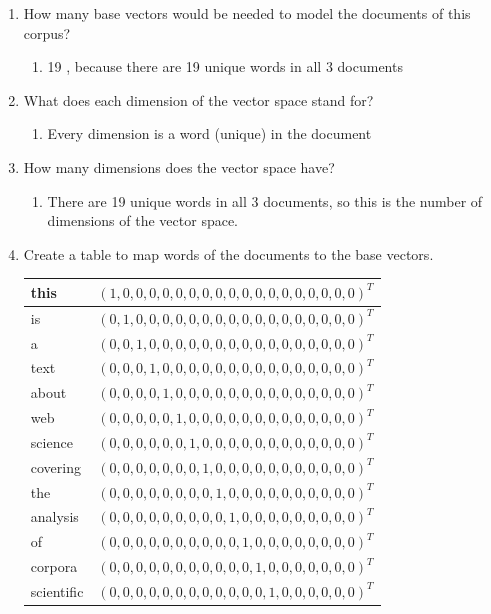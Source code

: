 \documentclass{WeSTassignment}
\begin{document}
\begin{enumerate}
\item How many base vectors would be needed to model the documents of this corpus?
\begin{enumerate}
\item 19 , because there are 19 unique words in all 3 documents
\end{enumerate}
\item What does each dimension of the vector space stand for?
\begin{enumerate}
\item Every dimension is a word (unique) in the document
\end{enumerate}
\item How many dimensions does the vector space have? 
\begin{enumerate}
\item There are 19 unique words in all 3 documents, so this is the number of dimensions of the vector space.
\end{enumerate}
\item Create a table to map words of the documents to the base vectors.\\
\begin{tabular}{ | l | r | }
\hline
  this & $(1,0,0,0,0,0,0,0,0,0,0,0,0,0,0,0,0,0,0)^{T}$ \\ \hline
  is & $(0,1,0,0,0,0,0,0,0,0,0,0,0,0,0,0,0,0,0)^{T}$ \\ \hline
  a & $(0,0,1,0,0,0,0,0,0,0,0,0,0,0,0,0,0,0,0)^{T}$\\ \hline
  text & $(0,0,0,1,0,0,0,0,0,0,0,0,0,0,0,0,0,0,0)^{T}$\\ \hline
  about & $(0,0,0,0,1,0,0,0,0,0,0,0,0,0,0,0,0,0,0)^{T}$\\ \hline
  web & $(0,0,0,0,0,1,0,0,0,0,0,0,0,0,0,0,0,0,0)^{T}$\\ \hline
  science & $(0,0,0,0,0,0,1,0,0,0,0,0,0,0,0,0,0,0,0)^{T}$\\ \hline
  covering & $(0,0,0,0,0,0,0,1,0,0,0,0,0,0,0,0,0,0,0)^{T}$ \\ \hline
  the & $(0,0,0,0,0,0,0,0,1,0,0,0,0,0,0,0,0,0,0)^{T}$\\ \hline
  analysis & $(0,0,0,0,0,0,0,0,0,1,0,0,0,0,0,0,0,0,0)^{T}$ \\ \hline
  of & $(0,0,0,0,0,0,0,0,0,0,1,0,0,0,0,0,0,0,0)^{T}$\\ \hline
  corpora & $(0,0,0,0,0,0,0,0,0,0,0,1,0,0,0,0,0,0,0)^{T}$\\ \hline
  scientific & $(0,0,0,0,0,0,0,0,0,0,0,0,1,0,0,0,0,0,0)^{T}$\\ \hline

\end{tabular}
\end{enumerate}
\end{document}
